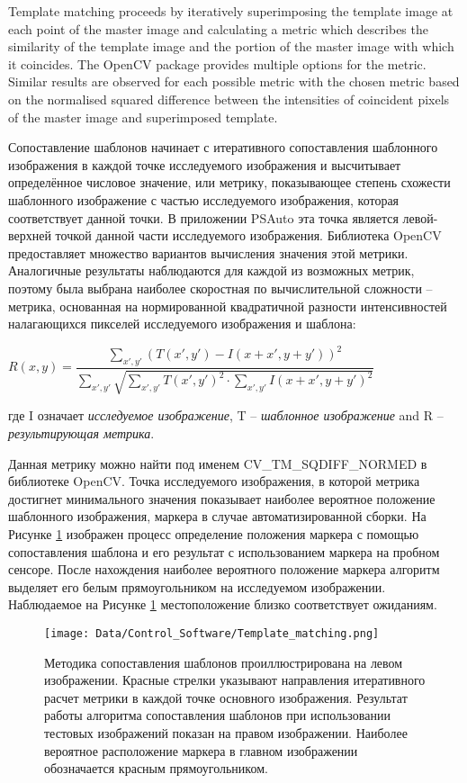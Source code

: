 Template matching proceeds by iteratively superimposing the template image at each point of the master image and calculating a metric which describes the similarity of the template image and the portion of the master image with which it coincides. The OpenCV package provides multiple options for the metric. Similar results are observed for each possible metric with the chosen metric based on the normalised squared difference between the intensities of coincident pixels of the master image and superimposed template.

Сопоставление шаблонов начинает с итеративного сопоставления шаблонного изображения в каждой точке исследуемого изображения и высчитывает определённое числовое значение, или метрику, показывающее степень схожести шаблонного изображение с частью исследуемого изображения, которая соответствует данной точки. В приложении PSAuto эта точка является левой-верхней точкой данной части исследуемого изображения. Библиотека OpenCV предоставляет множество вариантов вычисления значения этой метрики. Аналогичные результаты наблюдаются для каждой из возможных метрик, поэтому была выбрана наиболее скоростная по вычислительной сложности -- метрика, основанная на нормированной квадратичной разности интенсивностей налагающихся пикселей исследуемого изображения и шаблона:

\begin{center}
$R(x,y)=\dfrac{\sum_{x',y'}^{}(T(x',y')-I(x+x',y+y'))^{2}}{\sum_{x',y'}^{}\sqrt{\sum_{x',y'}^{}T(x',y')^{2}\cdot\sum_{x',y'}^{}I(x+x',y+y')^{2}}}$
\end{center}
где I означает \emph{исследуемое изображение}, T -- \emph{шаблонное изображение} and R -- \emph{результирующая метрика}.


Данная метрику можно найти под именем CV\_TM\_SQDIFF\_NORMED в библиотеке OpenCV. Точка исследуемого изображения, в которой метрика достигнет минимального значения показывает наиболее вероятное положение шаблонного изображения, маркера в случае автоматизированной сборки. На Рисунке \ref{fig:template_matching} изображен процесс определение положения маркера с помощью сопоставления шаблона и его результат с использованием маркера на пробном сенсоре. После нахождения наиболее вероятного положение маркера алгоритм выделяет его белым прямоугольником на исследуемом изображении. Наблюдаемое на Рисунке \ref{fig:template_matching} местоположение близко соответствует ожиданиям.

\begin{figure}[ht]\centering
\texttt{[image: Data/Control\_Software/Template\_matching.png]}
\caption{Методика сопоставления шаблонов проиллюстрирована на левом изображении. Красные стрелки указывают направления итеративного расчет метрики в каждой точке основного изображения. Результат работы алгоритма сопоставления шаблонов при использовании тестовых изображений показан на правом изображении. Наиболее вероятное расположение маркера в главном изображении обозначается красным прямоугольником.
}
\label{fig:template_matching}
\end{figure}

